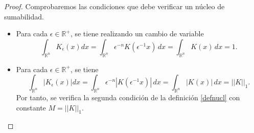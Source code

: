 \begin{proof}
Comprobaremos las condiciones que debe verificar un núcleo de sumabilidad. 
\begin{itemize}
    \item Para cada $\epsilon \in \mathbb{R}^+$, se tiene realizando un cambio de variable
    \begin{equation}
        \int_{\mathbb{R}^n}K_{\epsilon}(x) dx = \int_{\mathbb{R}^n} \epsilon^{-n}K(\epsilon^{-1}x) \, dx =  \int_{\mathbb{R}^n}K(x) \, dx = 1.
    \end{equation}
    \item   Para cada $\epsilon \in \mathbb{R}^+$, se tiene 
    \begin{equation}
        \int_{\mathbb{R}^n}|K_{\epsilon}(x)| dx = \int_{\mathbb{R}^n} \epsilon^{-n}|K(\epsilon^{-1}x)| \, dx =  \int_{\mathbb{R}^n}|K(x)| \, dx = ||K||_1.
    \end{equation}
    Por tanto, se verifica la segunda condición de la definición \ref{defnucl} con constante $M=||K||_1$.


\end{itemize}
\end{proof}
